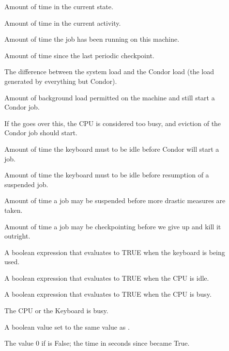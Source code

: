 \begin{description}
  
\item[] Amount of time in the current state.

\item[] Amount of time in the current activity. 

\item[] Amount of time the job has been running on
  this machine.

\item[] Amount of time since the last periodic checkpoint.

\item[] The difference between the system load and
  the Condor load (the load generated by everything but Condor).

\item[] Amount of background load permitted
  on the machine and still start a Condor job.

\item[] If the  goes over
  this, the CPU is considered too busy, and eviction of the Condor
  job should start. 

\item[] Amount of time the keyboard must to be idle
  before Condor will start a job.

\item[] Amount of time the keyboard must to be idle
  before resumption of a suspended job.

\item[] Amount of time a job may be
  suspended before more drastic measures are taken.

\item[] Amount of time a job may be
  checkpointing before we give up and kill it outright.

\item[] A boolean expression that evaluates to TRUE
    when the keyboard is being used.

\item[] A boolean expression that evaluates to TRUE
    when the CPU is idle.

\item[] A boolean expression that evaluates
    to TRUE when the CPU is busy.

\item[] The CPU or the Keyboard is busy.

\item[] A boolean value set to the same value as 
    .

\item[] The value 0 if 
    is False; the time in seconds since
     became True.
    
\end{description}

